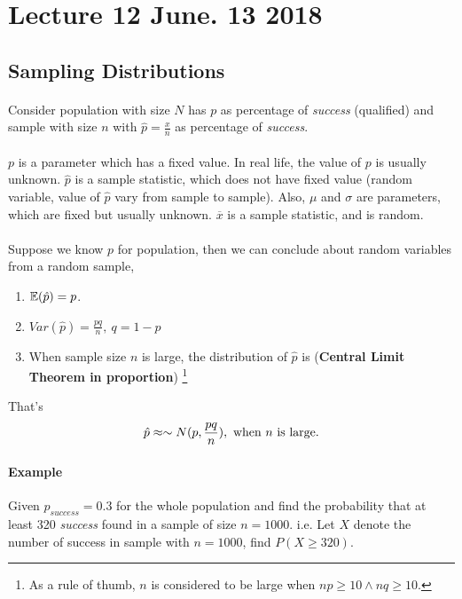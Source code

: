 \documentclass{article}
\begin{document}
	\section{Lecture 12 June. 13 2018}
		\subsection{Sampling Distributions}
			\paragraph{} Consider population with size $N$ has $p$ as percentage of \emph{success} (qualified) and sample with size $n$ with $\hat{p}=\frac{x}{n}$ as percentage of \emph{success}.
			\paragraph{} $p$ is a parameter which has a fixed value. In real life, the value of $p$ is usually unknown. $\hat{p}$ is a sample statistic, which does not have fixed value (random variable, value of $\hat{p}$ vary from sample to sample). Also, $\mu$ and $\sigma$ are parameters, which are fixed but usually unknown. $\overline{x}$ is a sample statistic, and is random.
			\paragraph{} Suppose we know $p$ for population, then we can conclude about random variables from a random sample,
				\begin{enumerate}
					\item $\mathbb{E}({\hat{p}}) = p$.
					\item $Var(\hat{p}) = \frac{pq}{n},\ q = 1-p$
					\item When sample size $n$ is large, the distribution of $\hat{p}$ is  (\textbf{Central Limit Theorem in proportion}) \footnote{As a rule of thumb, $n$ is considered to be large when $np\geq 10 \land nq \geq 10$.}
				\end{enumerate}
				That's
					\[
						\hat{p} \approx \sim N(p, \frac{pq}{n}),\ \text{{when $n$ is large.}}
					\]
			\paragraph{Example} Given $p_{success} = 0.3$ for the whole population and find the probability that at least 320 \emph{success}  found in a sample of size $n=1000$. i.e. Let $X$ denote the number of success in sample with $n=1000$, find $P(X \geq 320)$.
\end{document}
